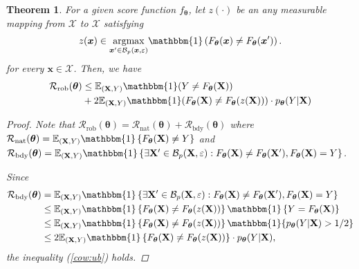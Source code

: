 \documentclass[nohyperref]{article}
\theoremstyle{plain}
\newtheorem{theorem}{Theorem}[section]
\theoremstyle{definition}
\theoremstyle{remark}
\begin{document}
\begin{theorem}
\label{thm:cow}
For a given score function $f_{\bm{\theta}}$, let $z(\cdot)$ be an any measurable mapping from $\mathcal{X}$ to $\mathcal{X}$ satisfying
\begin{equation*}
    z(\bm{x}) \in \underset{\bm{x}' \in \mathcal{B}_{p}(\bm{x}, \varepsilon)}{\operatorname{argmax}} \mathbbm{1} \left( F_{\bm{\theta}}(\bm{x}) \neq F_{\bm{\theta}}(\bm{x}')\right).
\end{equation*}
for every $\bm{x} \in \mathcal{X}$. Then, we have
\begin{align}
\label{cow:ub}
    \mathcal{R}_{\text{rob}}(\bm{\theta}) & \leq \mathbb{E}_{(\mathbf{X},Y)} \mathbbm{1}(Y \neq F_{\bm{\theta}}(\mathbf{X})) \nonumber \\
    & + 2 \mathbb{E}_{(\mathbf{X}, Y)}{\mathbbm{1}(F_{\bm{\theta}}(\mathbf{X}) \neq F_{\bm{\theta}}(z(\mathbf{X})))} \cdot p_{\bm{\theta}}(Y|\mathbf{X})
\end{align}
\begin{proof}

Note that $\mathcal{R}_{\text{rob}}({\bm{\theta}}) = \mathcal{R}_{\text{nat}}({\bm{\theta}}) + \mathcal{R}_{\text{bdy}}({\bm{\theta}})$ where
$\mathcal{R}_{\text{nat}}(\bm{\theta}) = \mathbb{E}_{(\mathbf{X}, Y)}\mathbbm{1}\left\{ F_{\bm{\theta}}(\mathbf{X}) \neq Y \right\}$ and 
$\mathcal{R}_{\text{bdy}}(\bm{\theta}) = \mathbb{E}_{(\mathbf{X}, Y)}\mathbbm{1}\left\{\exists \mathbf{X}' \in \mathcal{B}_p(\mathbf{X}, \varepsilon) :F_{\bm{\theta}}(\mathbf{X})\neq F_{\bm{\theta}}(\mathbf{X}')   ,F_{\bm{\theta}}(\mathbf{X}) = Y   \right\}$.

Since
\begin{align*} 
\mathcal{R}_{\text{bdy}}({\bm{\theta}}) &= \mathbb{E}_{(\mathbf{X}, Y)}\mathbbm{1}\left\{\exists \mathbf{X}' \in \mathcal{B}_p(\mathbf{X}, \varepsilon) : F_{\bm{\theta}}(\mathbf{X}) \neq F_{\bm{\theta}}(\mathbf{X}'), F_{\bm{\theta}}(\mathbf{X})=Y \right\} \\  
& \leq \mathbb{E}_{(\mathbf{X}, Y)} \mathbbm{1} \left\{ F_{\bm{\theta}}(\mathbf{X}) \neq F_{\bm{\theta}}(z(\mathbf{X})) \right\} \mathbbm{1}\left\{ Y = F_{\bm{\theta}}(\mathbf{X}) \right\} \\ 
& \leq  \mathbb{E}_{(\mathbf{X}, Y)} \mathbbm{1} \left\{ F_{\bm{\theta}}(\mathbf{X}) \neq F_{\bm{\theta}}(z(\mathbf{X})) \right\} \mathbbm{1}\{p_{\bm{\theta}}(Y|\mathbf{X}) > 1/2 \} \\
& \leq 2 \mathbb{E}_{(\mathbf{X}, Y)} \mathbbm{1} \left\{ F_{\bm{\theta}}(\mathbf{X}) \neq F_{\bm{\theta}}(z(\mathbf{X})) \right\}\cdot p_{\bm{\theta}}(Y|\mathbf{X}), 
\end{align*}
the inequality (\ref{cow:ub}) holds.
\end{proof}

\end{theorem}
\end{document}
